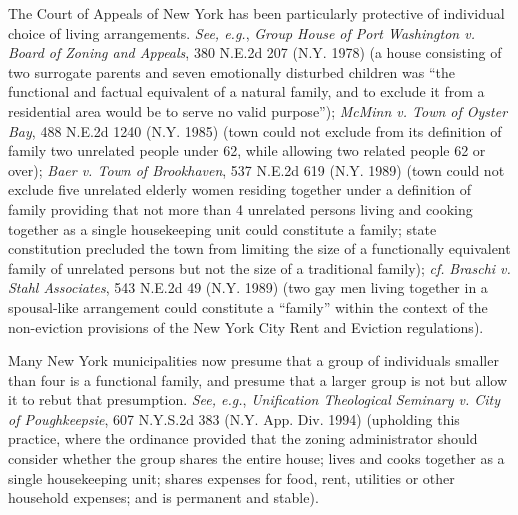 The Court of Appeals of New York has been particularly protective of individual
choice of living arrangements. \textit{See, e.g.}, \emph{Group House of Port
Washington v. Board of Zoning and Appeals}, 380
N.E.2d 207 (N.Y. 1978) (a house consisting of two surrogate parents and seven
emotionally disturbed children was ``the functional and factual equivalent
of a natural family, and to exclude it from a residential area would be to serve
no valid purpose''); \emph{McMinn v. Town of Oyster Bay}, 488 N.E.2d 1240 (N.Y.
1985) (town could not exclude from its definition of family two unrelated people
under 62, while allowing two related people 62 or over); \emph{Baer v. Town of
Brookhaven}, 537 N.E.2d 619 (N.Y. 1989) (town could not exclude five unrelated
elderly women residing together under a definition of family providing that not
more than 4 unrelated persons living and cooking together as a single
housekeeping unit could constitute a family; state constitution precluded the
town from limiting the size of a functionally equivalent family of unrelated
persons but not the size of a traditional family); \textit{cf.} \emph{Braschi v.
Stahl Associates}, 543 N.E.2d 49 (N.Y. 1989) (two gay men living together in a
spousal-like arrangement could constitute a ``family'' within the context of the
non-eviction provisions of the New York City Rent and Eviction regulations). 

Many New York municipalities now presume that a group of individuals smaller
than four is a functional family, and presume that a larger group is not but
allow it to rebut that presumption. \textit{See, e.g.}, \emph{Unification
Theological Seminary v. City of Poughkeepsie}, 607 N.Y.S.2d 383 (N.Y. App. Div.
1994) (upholding this practice, where the ordinance provided that the zoning
administrator should consider whether the group shares the entire house; lives
and cooks together as a single housekeeping unit; shares expenses for food,
rent, utilities or other household expenses; and is permanent and stable).

